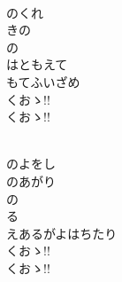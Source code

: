 \documentclass[10pt,b5j]{tarticle} %
\begin{document}
\vspace{1.5em} %
\newcommand{\linespace}{0.5em} %
\newcommand{\blocksize}{0.5\hsize} %
\newcommand{\itemmargin}{6em} %
\begin{enumerate} %
    \setlength{\itemindent}{\itemmargin} %
    \begin{minipage}[c]{\blocksize}
    
        \vspace{\linespace}
        \item~\\
        のくれ\\
        きの\\
        の\\
        はともえて\\
        もてふいざめ\\
        くおゝ!!\\
        くおゝ!!
        
        \vspace{\linespace}
        \item~\\
        のよをし\\
        のあがり\\
        の\\
        る\\
        えあるがよはちたり\\
        くおゝ!!\\
        くおゝ!!
    
    \end{minipage}
\end{enumerate} %
\end{document}
